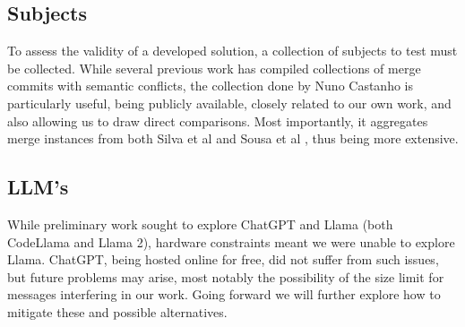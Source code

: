 \subsection{Subjects}

To assess the validity of a developed solution, a collection of subjects to test must be collected. While several previous work has compiled collections of merge commits with semantic conflicts, the collection done by Nuno Castanho \cite{kn:nuno} is particularly useful, being publicly available, closely related to our own work, and also allowing us to draw direct comparisons. Most importantly, it aggregates merge instances from both Silva et al \cite{kn:leuson} and Sousa et al \cite{kn:safemerge}, thus being more extensive.

\subsection{LLM's}

While preliminary work sought to explore ChatGPT and Llama (both CodeLlama and Llama 2), hardware constraints meant we were unable to explore Llama. ChatGPT, being hosted online for free, did not suffer from such issues, but future problems may arise, most notably the possibility of the size limit for messages interfering in our work. Going forward we will further explore how to mitigate these and possible alternatives.